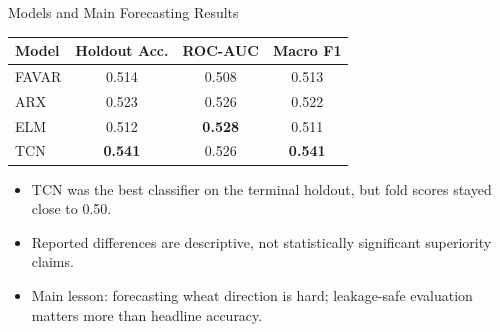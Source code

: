 \documentclass[10pt,aspectratio=169]{beamer}
\begin{document}
\begin{frame}{Models and Main Forecasting Results}
  \small
  \begin{table}
    \centering
    \begin{tabular}{@{}lccc@{}}
      \toprule
      Model & Holdout Acc. & ROC-AUC & Macro F1 \\
      \midrule
      FAVAR & 0.514 & 0.508 & 0.513 \\
      ARX   & 0.523 & 0.526 & 0.522 \\
      ELM   & 0.512 & \textbf{0.528} & 0.511 \\
      TCN   & \textbf{0.541} & 0.526 & \textbf{0.541} \\
      \bottomrule
    \end{tabular}
  \end{table}
  \begin{itemize}
    \item TCN was the best classifier on the terminal holdout, but fold scores stayed close to 0.50.
    \item Reported differences are descriptive, not statistically significant superiority claims.
    \item Main lesson: forecasting wheat direction is hard; leakage-safe evaluation matters more than headline accuracy.
  \end{itemize}
\end{frame}
\end{document}

